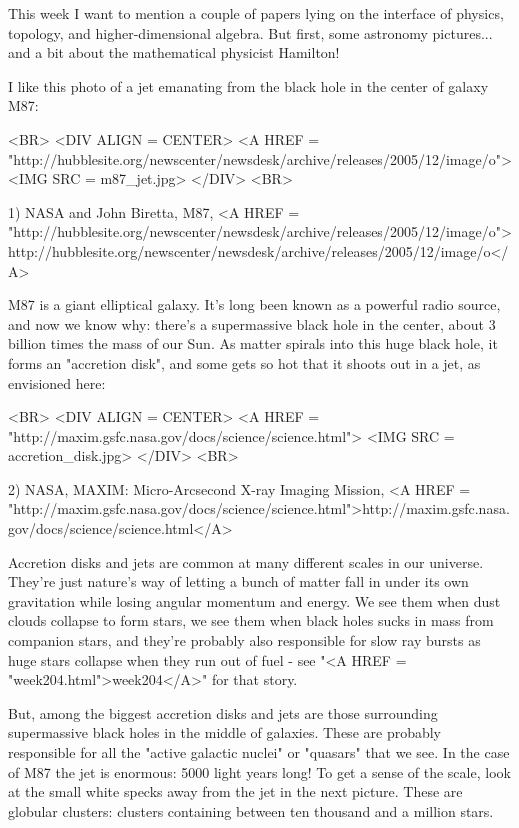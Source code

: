 


This week I want to mention a couple of papers lying on the interface of
physics, topology, and higher-dimensional algebra.  But first, some
astronomy pictures... and a bit about the mathematical physicist Hamilton!

I like this photo of a jet emanating from the black hole in the 
center of galaxy M87:

<BR>
<DIV ALIGN = CENTER>
<A HREF = "http://hubblesite.org/newscenter/newsdesk/archive/releases/2005/12/image/o">
<IMG SRC = m87_jet.jpg>
</DIV>
<BR>

1) NASA and John Biretta, M87,
<A HREF = "http://hubblesite.org/newscenter/newsdesk/archive/releases/2005/12/image/o">http://hubblesite.org/newscenter/newsdesk/archive/releases/2005/12/image/o</A>

M87 is a giant elliptical galaxy.  It's long been known as a powerful 
radio source, and now we know why: there's a supermassive black hole 
in the center, about 3 billion times the mass of our Sun.  As matter 
spirals into this huge black hole, it forms an "accretion disk", and
some gets so hot that it shoots out in a jet, as envisioned here:

<BR>
<DIV ALIGN = CENTER>
<A HREF = "http://maxim.gsfc.nasa.gov/docs/science/science.html">
<IMG SRC = accretion_disk.jpg>
</DIV>
<BR>

2) NASA, MAXIM: Micro-Arcsecond X-ray Imaging Mission,
<A HREF = "http://maxim.gsfc.nasa.gov/docs/science/science.html">http://maxim.gsfc.nasa.gov/docs/science/science.html</A>

Accretion disks and jets are common at many different scales in our 
universe.  They're just nature's way of letting a bunch of matter fall
in under its own gravitation while losing angular momentum and energy.  
We see them when dust clouds collapse to form stars, we see them when 
black holes sucks in mass from companion stars, and they're probably 
also responsible for slow \gamma  ray bursts as huge stars collapse when 
they run out of fuel - see "<A HREF = "week204.html">week204</A>" for that story.  

But, among the biggest accretion disks and jets are those surrounding
supermassive black holes in the middle of galaxies.  These are probably
responsible for all the "active galactic nuclei" or "quasars" that we
see.  In the case of M87 the jet is enormous: 5000 light years long!  
To get a sense of the scale, look at the small white specks away from the 
jet in the next picture.  These are globular clusters: clusters containing 
between ten thousand and a million stars.  

